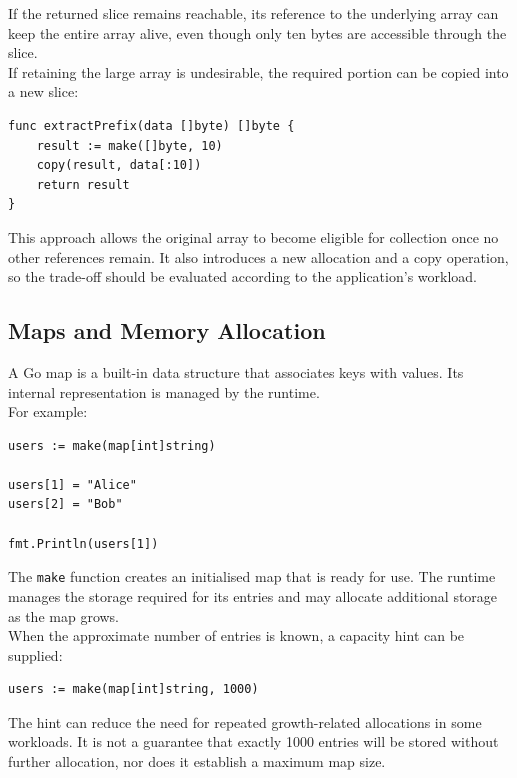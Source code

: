 If the returned slice remains reachable, its reference to the underlying array can keep the entire array alive, even though only ten bytes are accessible through the slice.\\

If retaining the large array is undesirable, the required portion can be copied into a new slice:

\begin{lstlisting}
func extractPrefix(data []byte) []byte {
    result := make([]byte, 10)
    copy(result, data[:10])
    return result
}
\end{lstlisting}

This approach allows the original array to become eligible for collection once no other references remain. It also introduces a new allocation and a copy operation, so the trade-off should be evaluated according to the application's workload.

\subsection{Maps and Memory Allocation}

A Go map is a built-in data structure that associates keys with values. Its internal representation is managed by the runtime.\\

For example:

\begin{lstlisting}
users := make(map[int]string)

users[1] = "Alice"
users[2] = "Bob"

fmt.Println(users[1])
\end{lstlisting}

The \texttt{make} function creates an initialised map that is ready for use. The runtime manages the storage required for its entries and may allocate additional storage as the map grows.\\

When the approximate number of entries is known, a capacity hint can be supplied:

\begin{lstlisting}
users := make(map[int]string, 1000)
\end{lstlisting}

The hint can reduce the need for repeated growth-related allocations in some workloads. It is not a guarantee that exactly 1000 entries will be stored without further allocation, nor does it establish a maximum map size.\\

